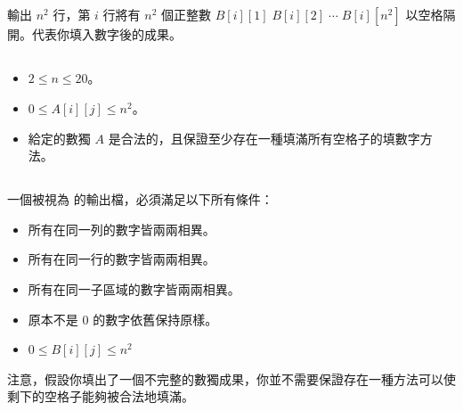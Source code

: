 \subsection*{}
輸出 $n^2$ 行，第 $i$ 行將有 $n^2$ 個正整數 $B[i][1]\;B[i][2]\;\cdots\;B[i][n^2]$ 以空格隔開。代表你填入數字後的成果。
\subsection*{}
\begin{itemize}
    \item $2\le n\le 20$。
    \item $0\le A[i][j]\le n^2$。
    \item 給定的數獨 $A$ 是合法的，且保證至少存在一種填滿所有空格子的填數字方法。
\end{itemize}
\subsection*{}
{
\setlength\parindent{0pt}
}
\subsection*{}
{
\setlength\parindent{0pt}
}
\subsection*{}
一個被視為  的輸出檔，必須滿足以下所有條件：

\begin{itemize}
    \item 所有在同一列的數字皆兩兩相異。
    \item 所有在同一行的數字皆兩兩相異。
    \item 所有在同一子區域的數字皆兩兩相異。
    \item 原本不是 $0$ 的數字依舊保持原樣。
    \item $0\le B[i][j]\le n^2$
\end{itemize}

注意，假設你填出了一個不完整的數獨成果，你並不需要保證存在一種方法可以使剩下的空格子能夠被合法地填滿。

